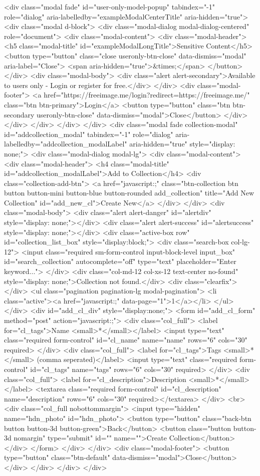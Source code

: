 <div class="modal fade" id="user-only-model-popup" tabindex="-1" role="dialog" aria-labelledby="exampleModalCenterTitle" aria-hidden="true">
<div class="modal d-block">
<div class="modal-dialog modal-dialog-centered" role="document">
<div class="modal-content">
<div class="modal-header">
<h5 class="modal-title" id="exampleModalLongTitle">Sensitive Content</h5>
<button type="button" class="close useronly-btn-close" data-dismiss="modal" aria-label="Close">
<span aria-hidden="true">&times;</span>
</button>
</div>
<div class="modal-body">
<div class="alert alert-secondary">Available to users only - Login or register for free.</div>
</div>
<div class="modal-footer">
<a href="https://freeimage.me/login?redirect=https://freeimage.me/" class="btn btn-primary">Login</a>
<button type="button" class="btn btn-secondary useronly-btn-close" data-dismiss="modal">Close</button>
</div>
</div>
</div>
</div>
</div> 
<div class="modal fade collection-modal" id="addcollection_modal" tabindex="-1" role="dialog" aria-labelledby="addcollection_modalLabel" aria-hidden="true" style="display: none;">
<div class="modal-dialog modal-lg">
<div class="modal-content">
<div class="modal-header">
<h4 class="modal-title" id="addcollection_modalLabel">Add to Collection</h4>
<div class="collection-add-btn">
<a href="javascript:;" class="btn-collection btn button button-mini button-blue button-rounded add_collection" title="Add New Collection" id="add_new_cl">Create New</a>
</div>
</div>
<div class="modal-body">
<div class="alert alert-danger" id="alertdiv" style="display: none;"></div>
<div class="alert alert-success" id="alertsuccess" style="display: none;"></div>
<div class="active-box row" id="collection_list_box" style="display:block;">
<div class="search-box col-lg-12">
<input class="required sm-form-control input-block-level input_box" id="search_collection" autocomplete="off" type="text" placeholder="Enter keyword...">
</div>
<div class="col-md-12 col-xs-12 text-center no-found" style="display: none;">Collection not found.</div>
<div class="clearfix"></div>
<ul class="pagination pagination-lg modal-pagination">
<li class="active"><a href="javascript:;" data-page="1">1</a></li>
</ul>
</div>
<div id="add_cl_div" style="display:none;">
<form id="add_cl_form" method="post" action="javascript:;">
<div class="col_full">
<label for="cl_tags">Name <small>*</small></label>
<input type="text" class="required form-control" id="cl_name" name="name" rows="6" cols="30" required>
</div>
<div class="col_full">
<label for="cl_tags">Tags <small>*</small> (comma seperated)</label>
<input type="text" class="required form-control" id="cl_tags" name="tags" rows="6" cols="30" required>
</div>
<div class="col_full">
<label for="cl_description">Description <small>*</small></label>
<textarea class="required form-control" id="cl_description" name="description" rows="6" cols="30" required></textarea>
</div>
<br>
<div class="col_full nobottommargin">
<input type="hidden" name="hdn_photo" id="hdn_photo">
<button type="button" class="back-btn button button-3d button-green">Back</button>
<button class="button button-3d nomargin" type="submit" id="" name="">Create Collection</button>
</div>
</form>
</div>
</div>
<div class="modal-footer">
<button type="button" class="btn-default" data-dismiss="modal">Close</button>
</div>
</div>
</div>
</div>

